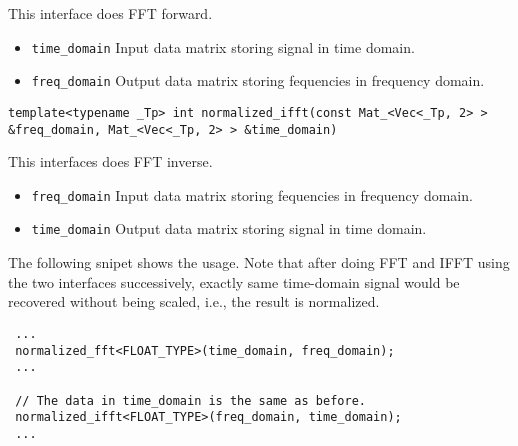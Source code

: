 \documentclass[a4paper,5pt]{article}
\begin{document}
This interface does FFT forward.

\begin{itemize}
\item \lstinline{time_domain} Input data matrix storing signal in time domain.
\item \lstinline{freq_domain} Output data matrix storing fequencies in frequency domain.
\end{itemize}

\noindent
\lstinline{template<typename _Tp> int normalized_ifft(const Mat_<Vec<_Tp, 2> > &freq_domain, Mat_<Vec<_Tp, 2> > &time_domain) }

This interfaces does FFT inverse.

\begin{itemize}
\item \lstinline{freq_domain} Input data matrix storing fequencies in frequency domain.
\item \lstinline{time_domain} Output data matrix storing signal in time domain.
\end{itemize}

The following snipet shows the usage. Note that after doing FFT and IFFT using the two interfaces successively, exactly same time-domain signal would be recovered without being scaled, i.e., the result is normalized.

\begin{lstlisting}
 ...
 normalized_fft<FLOAT_TYPE>(time_domain, freq_domain);
 ...
 
 // The data in time_domain is the same as before.
 normalized_ifft<FLOAT_TYPE>(freq_domain, time_domain);
 ...

\end{lstlisting}
\end{document}
